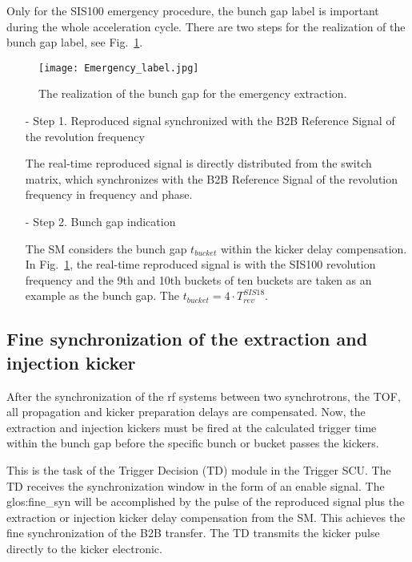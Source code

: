 \begin{itemize}
Only for the SIS100 emergency procedure, the bunch gap label is important during the whole acceleration cycle. There are two steps for the realization of the bunch gap label, see Fig.~\ref{Emergency_label}.
\begin{figure}[!htb]
   \centering   
   \texttt{[image: Emergency\_label.jpg]}
   \caption{The realization of the bunch gap for the emergency extraction.}
   \label{Emergency_label}
\end{figure} 

\begin{itemize}
\item[-] Step 1. Reproduced signal synchronized with the B2B Reference Signal of the revolution frequency

The real-time reproduced signal is directly distributed from the switch matrix, which synchronizes with the B2B Reference Signal of the revolution frequency in frequency and phase.
\item[-] Step 2. Bunch gap indication

The SM considers the bunch gap $t_{\mathit{bucket}}$ within the kicker delay compensation. In Fig.~\ref{Emergency_label}, the real-time reproduced signal is with the SIS100 revolution frequency and the 9th and 10th buckets of ten buckets are taken as an example as the bunch gap. The $t_{\mathit{bucket}}=4\cdot T_{\mathit{rev}}^{\mathit{SIS18}}$.

\end{itemize}

\end{itemize}

\subsection{Fine synchronization of the extraction and injection kicker}
After the synchronization of the rf systems between two synchrotrons, the TOF, all propagation and kicker preparation delays are compensated. Now, the extraction and injection kickers must be fired at the calculated trigger time within the bunch gap before the specific bunch or bucket passes the kickers.
 
This is the task of the Trigger Decision (TD) module in the Trigger SCU. The TD receives the  synchronization window in the form of an enable signal. The \gls{glos:fine_syn} will be accomplished by the pulse of the reproduced signal plus the extraction or injection kicker delay compensation from the SM. This achieves the fine synchronization of the B2B transfer. The TD transmits the kicker pulse directly to the kicker electronic.  
 
